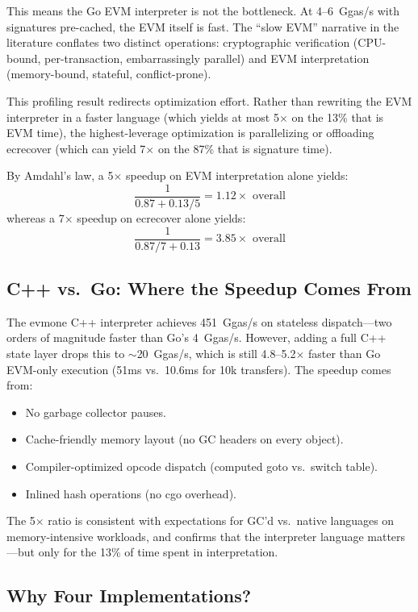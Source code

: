 \documentclass[11pt,twocolumn]{article}
\begin{document}
This means the Go EVM interpreter is not the bottleneck. At 4--6~Ggas/s with
signatures pre-cached, the EVM itself is fast. The ``slow EVM'' narrative in
the literature conflates two distinct operations: cryptographic verification
(CPU-bound, per-transaction, embarrassingly parallel) and EVM interpretation
(memory-bound, stateful, conflict-prone).

This profiling result redirects optimization effort. Rather than rewriting the
EVM interpreter in a faster language (which yields at most 5$\times$ on the 13\%
that is EVM time), the highest-leverage optimization is parallelizing or offloading
ecrecover (which can yield 7$\times$ on the 87\% that is signature time).

By Amdahl's law, a 5$\times$ speedup on EVM interpretation alone yields:
\[
\frac{1}{0.87 + 0.13/5} = 1.12\times \text{ overall}
\]
whereas a 7$\times$ speedup on ecrecover alone yields:
\[
\frac{1}{0.87/7 + 0.13} = 3.85\times \text{ overall}
\]

\subsection{C++ vs.\ Go: Where the Speedup Comes From}

The evmone C++ interpreter achieves 451~Ggas/s on stateless dispatch---two
orders of magnitude faster than Go's 4~Ggas/s. However, adding a full C++ state
layer drops this to $\sim$20~Ggas/s, which is still 4.8--5.2$\times$ faster
than Go EVM-only execution (51ms vs.\ 10.6ms for 10k transfers). The speedup
comes from:

\begin{itemize}
\item No garbage collector pauses.
\item Cache-friendly memory layout (no GC headers on every object).
\item Compiler-optimized opcode dispatch (computed goto vs.\ switch table).
\item Inlined hash operations (no cgo overhead).
\end{itemize}

The 5$\times$ ratio is consistent with expectations for GC'd vs.\ native
languages on memory-intensive workloads, and confirms that the interpreter
language matters---but only for the 13\% of time spent in interpretation.

\subsection{Why Four Implementations?}
\end{document}
